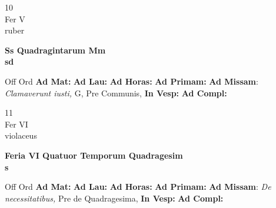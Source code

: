 \documentclass[10pt, openany]{book}
\begin{document}
    \begin{center}
        \begin{minipage}{3.5in}
            \vspace{2em}
            \begin{minipage}{0.5in}
                {\Huge 10} \\
                {\normalsize Fer V} \\
                {\normalsize ruber}
            \end{minipage}
            \begin{minipage}{3.0in}
                \textbf{ \large Ss Quadragintarum Mm \\
                \textnormal{\normalsize sd}} \\ 
            \end{minipage}
            \begin{justify}Off Ord
                \textbf{Ad Mat: }
                \textbf{Ad Lau: }
                \textbf{Ad Horas: }
                \textbf{Ad Primam: }\textbf{Ad Missam}: \textit{Clamaverunt iusti,} G, Pre Communis,  
                \textbf{In Vesp: }
                \textbf{Ad Compl: }
            \end{justify}
        \end{minipage}
    \end{center}

    \begin{center}
        \begin{minipage}{3.5in}
            \vspace{2em}
            \begin{minipage}{0.5in}
                {\Huge 11} \\
                {\normalsize Fer VI} \\
                {\normalsize violaceus}
            \end{minipage}
            \begin{minipage}{3.0in}
                \textbf{ \large Feria VI Quatuor Temporum Quadragesim \\
                \textnormal{\normalsize s}} \\ 
            \end{minipage}
            \begin{justify}Off Ord
                \textbf{Ad Mat: }
                \textbf{Ad Lau: }
                \textbf{Ad Horas: }
                \textbf{Ad Primam: }\textbf{Ad Missam}: \textit{De necessitatibus,} Pre de Quadragesima,  
                \textbf{In Vesp: }
                \textbf{Ad Compl: }
            \end{justify}
        \end{minipage}
    \end{center}
\end{document}
